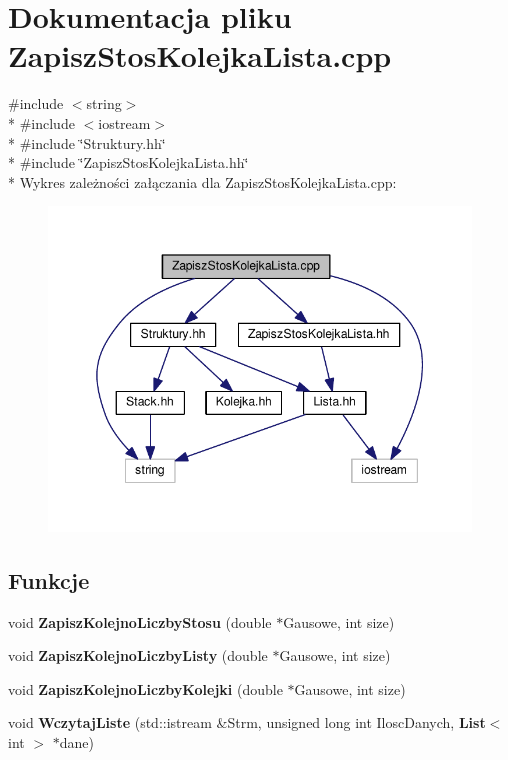 \section{Dokumentacja pliku Zapisz\-Stos\-Kolejka\-Lista.\-cpp}
\label{_zapisz_stos_kolejka_lista_8cpp}
{\ttfamily \#include $<$string$>$}\\*
{\ttfamily \#include $<$iostream$>$}\\*
{\ttfamily \#include \char`\"{}Struktury.\-hh\char`\"{}}\\*
{\ttfamily \#include \char`\"{}Zapisz\-Stos\-Kolejka\-Lista.\-hh\char`\"{}}\\*
Wykres zależności załączania dla Zapisz\-Stos\-Kolejka\-Lista.\-cpp\-:
\nopagebreak
\begin{figure}[H]
\begin{center}
\leavevmode
\includegraphics[width=349pt]{_zapisz_stos_kolejka_lista_8cpp__incl}
\end{center}
\end{figure}
\subsection*{Funkcje}
\begin{DoxyCompactItemize}
\item 
void {\bf Zapisz\-Kolejno\-Liczby\-Stosu} (double $\ast$Gausowe, int size)
\item 
void {\bf Zapisz\-Kolejno\-Liczby\-Listy} (double $\ast$Gausowe, int size)
\item 
void {\bf Zapisz\-Kolejno\-Liczby\-Kolejki} (double $\ast$Gausowe, int size)
\item 
void {\bf Wczytaj\-Liste} (std\-::istream \&Strm, unsigned long int Ilosc\-Danych, {\bf List}$<$ int $>$ $\ast$dane)
\end{DoxyCompactItemize}


